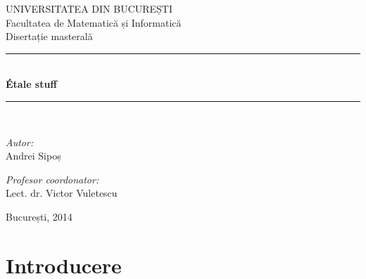 \documentclass[13pt]{book}
\begin{document}
\newtheorem{teo}{\bf Teorema}[section]
\newtheorem{cor}[teo]{\bf Corolarul}
\newtheorem{lema}[teo]{\bf Lema}
\newtheorem{prob}[teo]{\bf Problema}
\newtheorem{conj}[teo]{\bf Conjectura}
\newtheorem{propr}[teo]{\bf Proprietatea}
\newtheorem{prop}[teo]{\bf Propoziția}
\newtheorem{alg}[teo]{\bf Algoritmul}
\theoremstyle{remark}
\newtheorem{obs}[teo]{\bf Observația}
\newtheorem{obss}[teo]{\bf Observațiile}
\newtheorem{ex}[teo]{\bf Exemplul}
\newtheorem{exs}[teo]{\bf Exemplele}
\theoremstyle{definition}
\newtheorem{defi}[teo]{\bf Definiția}

\setcounter{page}{1}
\fontsize{3.9mm}{5mm}\selectfont
\pagestyle{empty}
\begin{center}

\LARGE UNIVERSITATEA DIN BUCUREȘTI\\[0.5cm]
\LARGE Facultatea de Matematică și Informatică\\[3cm]

\Large Disertație masterală\\[3.5cm] 
 
\rule{8cm}{0.5mm}\\[0.8cm]
{ \huge \bfseries Étale stuff}\\[0.2cm]
\rule{8cm}{0.5mm}\\[2.5cm]

\begin{minipage}{0.4\textwidth}
\begin{flushleft} \large
\emph{Autor:}\\
Andrei Sipoș
\end{flushleft}
\end{minipage}
\begin{minipage}{0.5\textwidth}
\begin{flushright} \large
\emph{Profesor coordonator:} \\
Lect. dr. Victor Vuletescu
\end{flushright}
\end{minipage}

\vfill

{\large București, 2014}

\end{center}
\newpage
\phantom{X}
\newpage

\pagestyle{headings}
\tableofcontents
\newpage

\setlength{\parskip}{1.5ex plus 0.5ex minus 0.2ex}
\chapter{Introducere}
\end{document}
